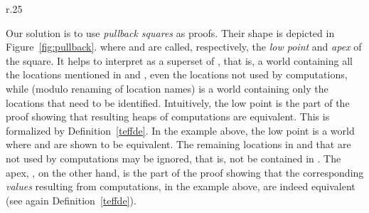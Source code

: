 \documentclass[orivec]{llncs}
\begin{document}
\begin{wrapfigure}{r}{.25\textwidth}
 \vspace{-12mm}

\caption{Pullback square.}
\label{fig:pullback}
\vspace{-9mm}
\end{wrapfigure}
Our solution is to use \emph{pullback squares} as proofs. Their shape is
depicted in Figure~\ref{fig:pullback}.
where  and  are called, respectively, the
\emph{low point} and \emph{apex} of the square.  It helps to interpret
 as a superset of , that is, a world
containing all the locations mentioned in  and , even the
locations not used by computations, while  (modulo renaming of location names) is a world containing only
the locations that need to be identified. Intuitively, the low point
is the part of the proof showing that resulting heaps of computations are
equivalent. This is formalized by Definition~\ref{teffde}. In the
example above,
the low point is a world where  and  are
shown to be equivalent. The remaining locations in  and  that
are not used by computations may be ignored, that is, not be contained in
. 
The apex, , on the other hand, is the part of the proof 
showing that the corresponding \emph{values} resulting from computations,
 in the example above, are indeed equivalent (see again
Definition~\ref{teffde}). 
\end{document}
